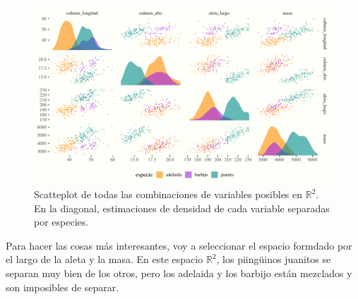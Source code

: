 \documentclass[]{tufte-handout}
\begin{document}
\begin{figure}
\includegraphics{TP-Labo-2_files/figure-latex/pairs-1} \caption[Scatteplot de todas las combinaciones de variables posibles en $\mathbb{R}^2$]{Scatteplot de todas las combinaciones de variables posibles en $\mathbb{R}^2$. En la diagonal, estimaciones de densidad de cada variable separadas por especies.}\label{fig:pairs}
\end{figure}

Para hacer las cosas más interesantes, voy a seleccionar el espacio formdado por el largo de la aleta y la masa. En este espacio \(\mathbb{R}^2\), los piingüinos juanitos se separan muy bien de los otros, pero los adelaida y los barbijo están mezclados y son imposibles de separar.
\end{document}
